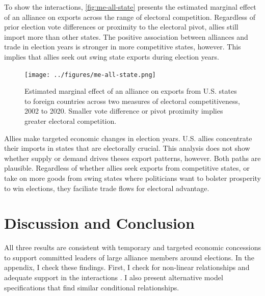 \documentclass[12pt]{article}
\begin{document}
To show the interactions, \autoref{fig:me-all-state} presents the estimated marginal effect of an alliance on exports across the range of electoral competition. 
Regardless of prior election vote differences or proximity to the electoral pivot, allies still import more than other states.
The positive association between alliances and trade in election years is stronger in more competitive states, however. 
This implies that allies seek out swing state exports during election years. 


\begin{figure}[htpb]
	\centering
		\texttt{[image: ../figures/me-all-state.png]}
	\caption{Estimated marginal effect of an alliance on exports from U.S. states to foreign countries across two measures of electoral competitiveness, 2002 to 2020. Smaller vote difference or pivot proximity implies greater electoral competition.}
	\label{fig:me-all-state}
\end{figure}


Allies make targeted economic changes in election years. 
U.S. allies concentrate their imports in states that are electorally crucial.
This analysis does not show whether supply or demand drives theses export patterns, however. 
Both paths are plausible. 
Regardless of whether allies seek exports from competitive states, or take on more goods from swing states where politicians want to bolster prosperity to win elections, they faciliate trade flows for electoral advantage. 





\section{Discussion and Conclusion}


All three results are consistent with temporary and targeted economic concessions to support committed leaders of large alliance members around elections. 
In the appendix, I check these findings.
First, I check for non-linear relationships and adequate support in the interactions \citep{Hainmuelleretal2019}. 
I also present alternative model specifications that find similar conditional relationships.
\end{document}
